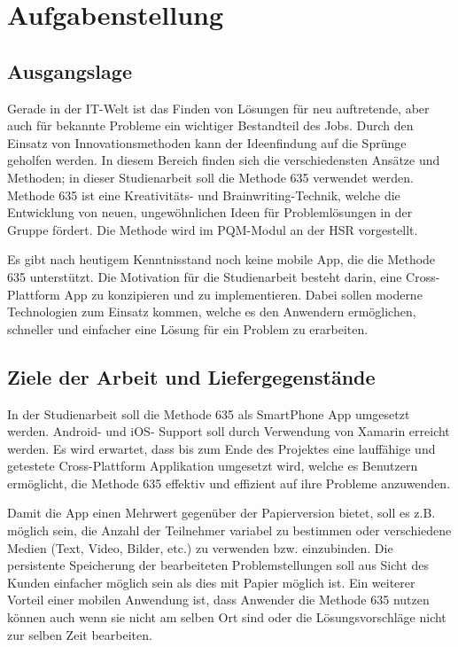 \section{Aufgabenstellung}

\subsection{Ausgangslage}
Gerade in der IT-Welt ist das Finden von Lösungen für neu auftretende, aber auch für bekannte Probleme ein wichtiger Bestandteil des Jobs. Durch den Einsatz von Innovationsmethoden kann der Ideenfindung auf die Sprünge geholfen werden. In diesem Bereich finden sich die verschiedensten Ansätze und Methoden; in dieser Studienarbeit soll die Methode 635 verwendet werden. Methode 635 \cite{methode-635} ist eine Kreativitäts- und Brainwriting-Technik, welche die Entwicklung von neuen, ungewöhnlichen Ideen für Problemlösungen in der Gruppe fördert. Die Methode wird im PQM-Modul an der HSR vorgestellt.
 
Es gibt nach heutigem Kenntnisstand noch keine mobile App, die die Methode 635 unterstützt. Die Motivation für die Studienarbeit besteht darin, eine Cross-Plattform App zu konzipieren und zu implementieren. Dabei sollen moderne Technologien zum Einsatz kommen, welche es den Anwendern ermöglichen, schneller und einfacher eine Lösung für ein Problem zu erarbeiten.

\subsection{Ziele der Arbeit und Liefergegenstände}
In der Studienarbeit soll die Methode 635 als SmartPhone App umgesetzt werden. Android- und iOS- Support soll durch Verwendung von Xamarin erreicht werden.
Es wird erwartet, dass bis zum Ende des Projektes eine lauffähige und getestete Cross-Plattform Applikation umgesetzt wird, welche es Benutzern ermöglicht, die Methode 635 effektiv und effizient auf ihre Probleme anzuwenden. 

Damit die App einen Mehrwert gegenüber der Papierversion bietet, soll es z.B. möglich sein, die Anzahl der Teilnehmer variabel zu bestimmen oder verschiedene Medien (Text, Video, Bilder, etc.) zu verwenden bzw. einzubinden. Die persistente Speicherung der bearbeiteten Problemstellungen soll aus Sicht des Kunden einfacher möglich sein als dies mit Papier möglich ist. Ein weiterer Vorteil einer mobilen Anwendung ist, dass Anwender die Methode 635 nutzen können auch wenn sie nicht am selben Ort sind oder die Lösungsvorschläge nicht zur selben Zeit bearbeiten. 


